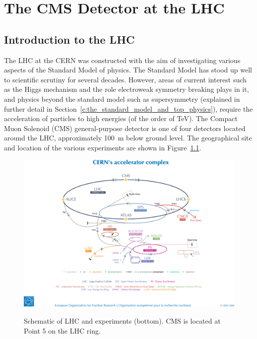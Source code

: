 \chapter{The CMS Detector at the LHC}
\label{c:CMS_Detector}

\section{Introduction to the LHC}
\label{s:Introduction}
The LHC at the CERN was constructed with the aim of investigating various aspects of the Standard Model of
physics. The Standard Model has stood up well to scientific scrutiny for several decades.
However, areas of current interest such as the Higgs mechanism and the role electroweak symmetry breaking
plays in it, and physics beyond the standard model such as supersymmetry (explained in further detail in
Section~\ref{c:the_standard_model_and_top_physics}), require the acceleration of particles to high energies
(of the order of TeV). The Compact Muon Solenoid (CMS) general-purpose detector is one of four detectors
located around the LHC, approximately 100~m below ground level. The geographical site and location of the
various experiments are shown in Figure~\ref{fig:LHC_schematic}.

\begin{figure}[hbtp]
   \centering
     \includegraphics[width=\textwidth]{Chapters/02_Detector/Images/0812015.jpg}\\
     \caption{Schematic of LHC and experiments (bottom). CMS is located at Point
     5 on the LHC ring.}
     \label{fig:LHC_schematic}
\end{figure}


